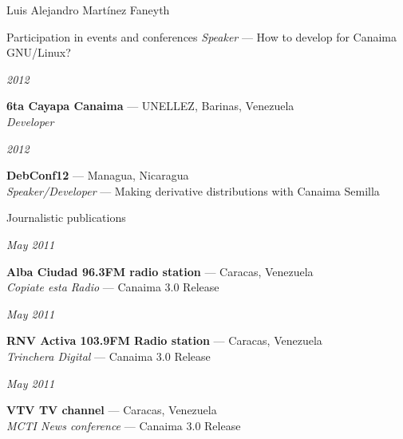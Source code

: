 \documentclass[11pt,letterpaper]{article}
\begin{document}
\begin{cv}{Luis Alejandro Mart\'inez Faneyth}
\begin{cvlist}{Participation in events and conferences}
{{		\textit{Speaker} --- How to develop for Canaima GNU/Linux?
	}
}
\item[{\parbox[t]{6em}{\textit{\large{2012}}}}]{
	\parbox[t]{\linewidth}{
		\textbf{6ta Cayapa Canaima} --- UNELLEZ, Barinas, Venezuela\\
		\textit{Developer}
	}
}
\item[{\parbox[t]{6em}{\textit{\large{2012}}}}]{
	\parbox[t]{\linewidth}{
		\textbf{DebConf12} --- Managua, Nicaragua\\
		\textit{Speaker/Developer} --- Making derivative distributions with Canaima Semilla
	}
}
\end{cvlist}

\begin{cvlist}{Journalistic publications}
\item[{\parbox[t]{6em}{\textit{\large{May 2011}}}}]{
	\parbox[t]{\linewidth}{
		\textbf{Alba Ciudad 96.3FM radio station} --- Caracas, Venezuela\\
		\textit{Copiate esta Radio} --- Canaima 3.0 Release
	}
}
\item[{\parbox[t]{6em}{\textit{\large{May 2011}}}}]{
	\parbox[t]{\linewidth}{
		\textbf{RNV Activa 103.9FM Radio station} --- Caracas, Venezuela\\
		\textit{Trinchera Digital} --- Canaima 3.0 Release
	}
}
\item[{\parbox[t]{6em}{\textit{\large{May 2011}}}}]{
	\parbox[t]{\linewidth}{
		\textbf{VTV TV channel} --- Caracas, Venezuela\\
		\textit{MCTI News conference} --- Canaima 3.0 Release
	}
}
\end{cvlist}


\end{cv}
\end{document}
